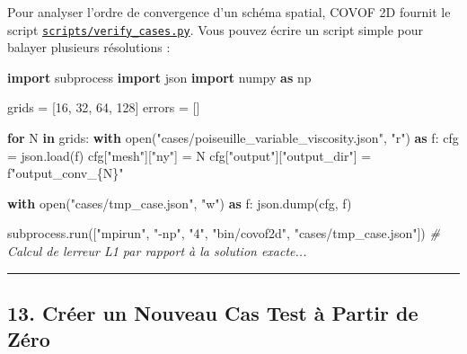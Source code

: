 \documentclass[
  french,
]{article}
\newenvironment{Shaded}{}{}
\newcommand{\BuiltInTok}[1]{\textcolor[rgb]{0.00,0.50,0.00}{#1}}
\newcommand{\CommentTok}[1]{\textcolor[rgb]{0.38,0.63,0.69}{\textit{#1}}}
\newcommand{\ControlFlowTok}[1]{\textcolor[rgb]{0.00,0.44,0.13}{\textbf{#1}}}
\newcommand{\DecValTok}[1]{\textcolor[rgb]{0.25,0.63,0.44}{#1}}
\newcommand{\ImportTok}[1]{\textcolor[rgb]{0.00,0.50,0.00}{\textbf{#1}}}
\newcommand{\KeywordTok}[1]{\textcolor[rgb]{0.00,0.44,0.13}{\textbf{#1}}}
\newcommand{\NormalTok}[1]{#1}
\newcommand{\OperatorTok}[1]{\textcolor[rgb]{0.40,0.40,0.40}{#1}}
\newcommand{\SpecialCharTok}[1]{\textcolor[rgb]{0.25,0.44,0.63}{#1}}
\newcommand{\SpecialStringTok}[1]{\textcolor[rgb]{0.73,0.40,0.53}{#1}}
\newcommand{\StringTok}[1]{\textcolor[rgb]{0.25,0.44,0.63}{#1}}
\begin{document}
Pour analyser l'ordre de convergence d'un schéma spatial, COVOF 2D
fournit le script
\href{scripts/verify_cases.py}{\texttt{scripts/verify\_cases.py}}. Vous
pouvez écrire un script simple pour balayer plusieurs résolutions :

\begin{Shaded}
\begin{Highlighting}[]
\ImportTok{import}\NormalTok{ subprocess}
\ImportTok{import}\NormalTok{ json}
\ImportTok{import}\NormalTok{ numpy }\ImportTok{as}\NormalTok{ np}

\NormalTok{grids }\OperatorTok{=}\NormalTok{ [}\DecValTok{16}\NormalTok{, }\DecValTok{32}\NormalTok{, }\DecValTok{64}\NormalTok{, }\DecValTok{128}\NormalTok{]}
\NormalTok{errors }\OperatorTok{=}\NormalTok{ []}

\ControlFlowTok{for}\NormalTok{ N }\KeywordTok{in}\NormalTok{ grids:}
    \ControlFlowTok{with} \BuiltInTok{open}\NormalTok{(}\StringTok{"cases/poiseuille\_variable\_viscosity.json"}\NormalTok{, }\StringTok{"r"}\NormalTok{) }\ImportTok{as}\NormalTok{ f:}
\NormalTok{        cfg }\OperatorTok{=}\NormalTok{ json.load(f)}
\NormalTok{    cfg[}\StringTok{"mesh"}\NormalTok{][}\StringTok{"ny"}\NormalTok{] }\OperatorTok{=}\NormalTok{ N}
\NormalTok{    cfg[}\StringTok{"output"}\NormalTok{][}\StringTok{"output\_dir"}\NormalTok{] }\OperatorTok{=} \SpecialStringTok{f"output\_conv\_}\SpecialCharTok{\{}\NormalTok{N}\SpecialCharTok{\}}\SpecialStringTok{"}
    
    \ControlFlowTok{with} \BuiltInTok{open}\NormalTok{(}\StringTok{"cases/tmp\_case.json"}\NormalTok{, }\StringTok{"w"}\NormalTok{) }\ImportTok{as}\NormalTok{ f:}
\NormalTok{        json.dump(cfg, f)}
        
\NormalTok{    subprocess.run([}\StringTok{"mpirun"}\NormalTok{, }\StringTok{"{-}np"}\NormalTok{, }\StringTok{"4"}\NormalTok{, }\StringTok{"bin/covof2d"}\NormalTok{, }\StringTok{"cases/tmp\_case.json"}\NormalTok{])}
    \CommentTok{\# Calcul de l\textquotesingle{}erreur L1 par rapport à la solution exacte...}
\end{Highlighting}
\end{Shaded}

\begin{center}\rule{0.5\linewidth}{0.5pt}\end{center}

\subsection{13. Créer un Nouveau Cas Test à Partir de
Zéro}\label{cruxe9er-un-nouveau-cas-test-uxe0-partir-de-zuxe9ro}
\end{document}
